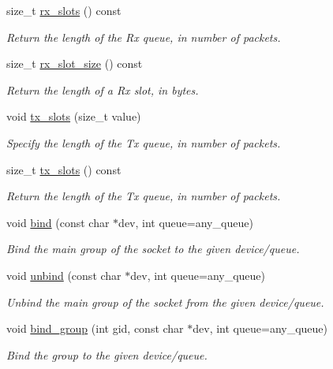 \begin{DoxyCompactItemize}
size\+\_\+t \hyperlink{classpfq_1_1socket_a34d80296c96c3e727f437d0be1b81dd8}{rx\+\_\+slots} () const
\begin{DoxyCompactList}\small\item\em Return the length of the Rx queue, in number of packets. \end{DoxyCompactList}\item 
size\+\_\+t \hyperlink{classpfq_1_1socket_ac46fe8e1ba3313003dc3e4ee1411ef63}{rx\+\_\+slot\+\_\+size} () const
\begin{DoxyCompactList}\small\item\em Return the length of a Rx slot, in bytes. \end{DoxyCompactList}\item 
void \hyperlink{classpfq_1_1socket_a019d15a072c043d6a1333ca0c836da4c}{tx\+\_\+slots} (size\+\_\+t value)
\begin{DoxyCompactList}\small\item\em Specify the length of the Tx queue, in number of packets. \end{DoxyCompactList}\item 
size\+\_\+t \hyperlink{classpfq_1_1socket_a99c77a5c33e925f47f47c51b384e4fda}{tx\+\_\+slots} () const
\begin{DoxyCompactList}\small\item\em Return the length of the Tx queue, in number of packets. \end{DoxyCompactList}\item 
void \hyperlink{classpfq_1_1socket_a3a0fc5c70e2d2615e29d06ac55007ed3}{bind} (const char $\ast$dev, int queue=any\+\_\+queue)
\begin{DoxyCompactList}\small\item\em Bind the main group of the socket to the given device/queue. \end{DoxyCompactList}\item 
void \hyperlink{classpfq_1_1socket_af53d407f46ba2b4d143782ff7d585758}{unbind} (const char $\ast$dev, int queue=any\+\_\+queue)
\begin{DoxyCompactList}\small\item\em Unbind the main group of the socket from the given device/queue. \end{DoxyCompactList}\item 
void \hyperlink{classpfq_1_1socket_a4d4d44cc68af0290e3c494dcd10b1541}{bind\+\_\+group} (int gid, const char $\ast$dev, int queue=any\+\_\+queue)
\begin{DoxyCompactList}\small\item\em Bind the group to the given device/queue. \end{DoxyCompactList}\item 

\end{DoxyCompactItemize}
